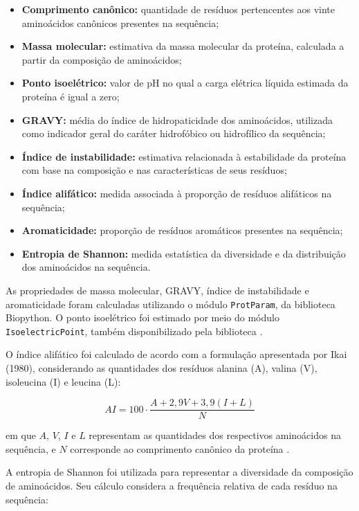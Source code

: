 \begin{itemize}
    \item \textbf{Comprimento canônico:} quantidade de resíduos pertencentes aos vinte aminoácidos canônicos presentes na sequência;
    \item \textbf{Massa molecular:} estimativa da massa molecular da proteína, calculada a partir da composição de aminoácidos;
    \item \textbf{Ponto isoelétrico:} valor de pH no qual a carga elétrica líquida estimada da proteína é igual a zero;
    \item \textbf{GRAVY:} média do índice de hidropaticidade dos aminoácidos, utilizada como indicador geral do caráter hidrofóbico ou hidrofílico da sequência;
    \item \textbf{Índice de instabilidade:} estimativa relacionada à estabilidade da proteína com base na composição e nas características de seus resíduos;
    \item \textbf{Índice alifático:} medida associada à proporção de resíduos alifáticos na sequência;
    \item \textbf{Aromaticidade:} proporção de resíduos aromáticos presentes na sequência;
    \item \textbf{Entropia de Shannon:} medida estatística da diversidade e da distribuição dos aminoácidos na sequência.
\end{itemize}

As propriedades de massa molecular, GRAVY, índice de instabilidade e aromaticidade foram calculadas utilizando o módulo \texttt{ProtParam}, da biblioteca Biopython. O ponto isoelétrico foi estimado por meio do módulo \texttt{IsoelectricPoint}, também disponibilizado pela biblioteca \cite{cock2009}.

O índice alifático foi calculado de acordo com a formulação apresentada por Ikai (1980), considerando as quantidades dos resíduos alanina (A), valina (V), isoleucina (I) e leucina (L):

\begin{equation}
AI = 100 \cdot \frac{A + 2{,}9V + 3{,}9(I+L)}{N}
\end{equation}

em que $A$, $V$, $I$ e $L$ representam as quantidades dos respectivos aminoácidos na sequência, e $N$ corresponde ao comprimento canônico da proteína \cite{ikai1980}.

A entropia de Shannon foi utilizada para representar a diversidade da composição de aminoácidos. Seu cálculo considera a frequência relativa de cada resíduo na sequência:

